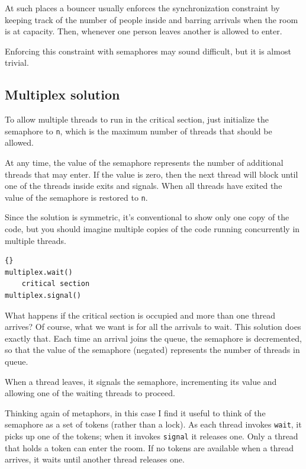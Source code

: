 \documentclass{book}
\newcommand{\clearemptydoublepage}{\newpage\cleardoublepage}
\begin{document}
At such places a bouncer usually enforces the synchronization
constraint by keeping track of the number of people inside
and barring arrivals when the room is at capacity.  Then,
whenever one person leaves another is allowed to enter.

Enforcing this constraint with semaphores may sound difficult, but it
is almost trivial.


\clearemptydoublepage
\subsection{Multiplex solution}

To allow multiple threads to run in the critical section, just
initialize the semaphore to {\tt n}, which is the maximum number
of threads that should be allowed.

At any time, the value of the semaphore represents the
number of additional threads that may enter.  If the value is zero,
then the next thread will block until one of the threads inside
exits and signals.  When all threads have exited the value of the
semaphore is restored to {\tt n}.

Since the solution is symmetric, it's conventional to show only one
copy of the code, but you should imagine multiple copies of the code
running concurrently in multiple threads.

\begin{lstlisting}[caption={Multiplex solution}]{}
multiplex.wait()
    critical section 
multiplex.signal()      
\end{lstlisting}

What happens if the critical section is occupied and more than one
thread arrives?  Of course, what we want is for all the arrivals to
wait.  This solution does exactly that.  Each time an arrival joins
the queue, the semaphore is decremented, so that the value of the
semaphore (negated) represents the number of threads in queue.

When a thread leaves, it signals the semaphore, incrementing
its value and allowing one of the waiting threads to proceed.

Thinking again of metaphors, in this case I find it useful
to think of the semaphore as a set of tokens (rather than
a lock).
As each thread invokes {\tt wait}, it picks up one of
the tokens; when it invokes {\tt signal} it releases one.
Only a thread that holds a token can enter the room.  If no
tokens are available when a thread arrives, it waits until
another thread releases one.
\end{document}
